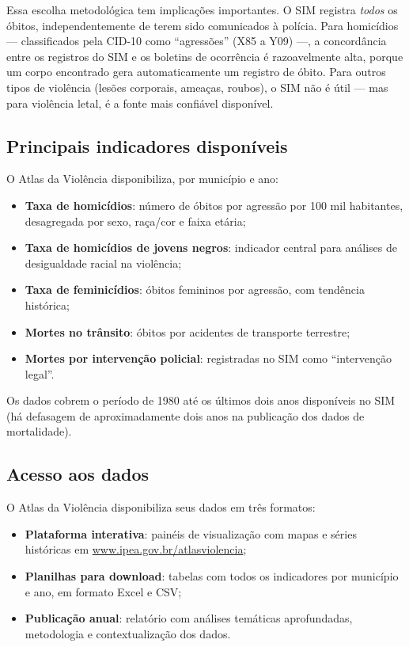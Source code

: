 Essa escolha metodológica tem implicações importantes. O SIM registra \textit{todos} os óbitos, independentemente de terem sido comunicados à polícia. Para homicídios --- classificados pela CID-10 como ``agressões'' (X85 a Y09) ---, a concordância entre os registros do SIM e os boletins de ocorrência é razoavelmente alta, porque um corpo encontrado gera automaticamente um registro de óbito. Para outros tipos de violência (lesões corporais, ameaças, roubos), o SIM não é útil --- mas para violência letal, é a fonte mais confiável disponível.

\subsection{Principais indicadores disponíveis}

O Atlas da Violência disponibiliza, por município e ano:

\begin{itemize}
  \item \textbf{Taxa de homicídios}: número de óbitos por agressão por 100 mil habitantes, desagregada por sexo, raça/cor e faixa etária;
  \item \textbf{Taxa de homicídios de jovens negros}: indicador central para análises de desigualdade racial na violência;
  \item \textbf{Taxa de feminicídios}: óbitos femininos por agressão, com tendência histórica;
  \item \textbf{Mortes no trânsito}: óbitos por acidentes de transporte terrestre;
  \item \textbf{Mortes por intervenção policial}: registradas no SIM como ``intervenção legal''.
\end{itemize}

Os dados cobrem o período de 1980 até os últimos dois anos disponíveis no SIM (há defasagem de aproximadamente dois anos na publicação dos dados de mortalidade).

\subsection{Acesso aos dados}

O Atlas da Violência disponibiliza seus dados em três formatos:
\begin{itemize}
  \item \textbf{Plataforma interativa}: painéis de visualização com mapas e séries históricas em \url{www.ipea.gov.br/atlasviolencia};
  \item \textbf{Planilhas para download}: tabelas com todos os indicadores por município e ano, em formato Excel e CSV;
  \item \textbf{Publicação anual}: relatório com análises temáticas aprofundadas, metodologia e contextualização dos dados.
\end{itemize}


